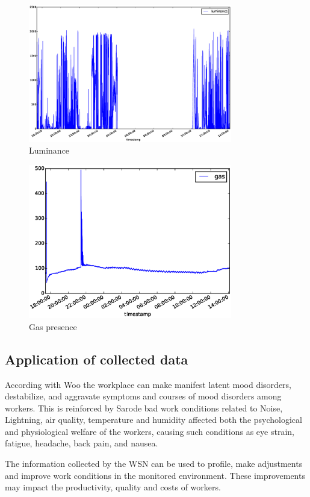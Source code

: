 \documentclass[letterpaper]{IEEEtran}
\begin{document}
\begin{figure}[ht!]
\centering
\includegraphics[width=3.5in]{plot_luminance}
\caption{Luminance}
\label{luminance_plot}
\end{figure}

\begin{figure}[ht!]
\centering
\includegraphics[width=3.5in]{plot_gas}
\caption{Gas presence}
\label{gas_plot}
\end{figure}

\subsection{Application of collected data}
According with Woo\cite{Woo2008} the workplace can make manifest latent mood disorders, destabilize, and aggravate symptoms and courses of mood disorders among workers. This is reinforced by Sarode\cite{Sarode2014} bad work conditions related to Noise, Lightning, air quality, temperature and humidity affected both the psychological and physiological welfare of the workers, causing such conditions as eye strain, fatigue, headache, back pain, and nausea.

The information collected by the WSN can be used to profile, make adjustments and improve work conditions in the monitored environment. These improvements may impact the productivity, quality and costs of workers.
\end{document}
